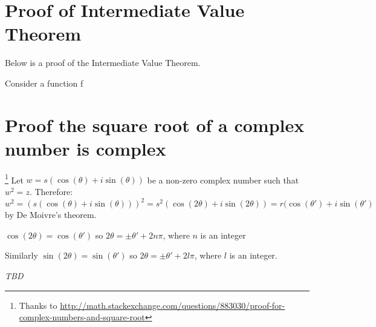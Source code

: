 \documentclass[12pt]{article}
\begin{document}
\begin{appendices}
\section*{Proof of Intermediate Value Theorem}
Below is a proof of the Intermediate Value Theorem.

Consider a function f




\section*{Proof the square root of a complex number is complex}\footnote{Thanks to \url{http://math.stackexchange.com/questions/883030/proof-for-complex-numbers-and-square-root}}
Let $w = s(\cos(\theta) + i \sin(\theta))$ be a non-zero complex number such that $w^2 = z$.  Therefore:
$$w^2 = (s(\cos(\theta) + i \sin(\theta)))^2 = s^2(\cos(2 \theta) + i \sin(2 \theta)) = r (\cos(\theta')+ i \sin(\theta')$$
by De Moivre's theorem.

$\cos(2 \theta) = \cos(\theta')$ so $2 \theta = \pm \theta' + 2n\pi$, where $n$ is an integer

Similarly $\sin(2 \theta) = \sin(\theta')$ so $2 \theta = \pm \theta' + 2l\pi$, where $l$ is an integer.


\emph{TBD}

\end{appendices}
\end{document}
